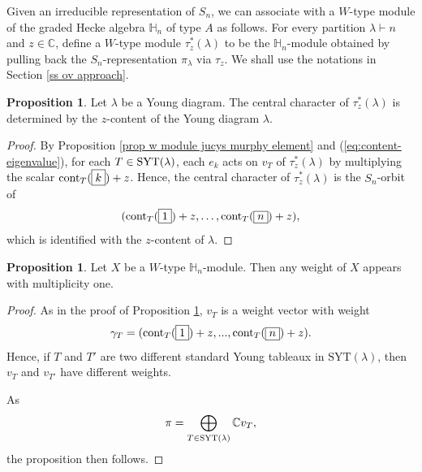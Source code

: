 \documentclass[11pt]{amsart}
\numberwithin{equation}{section}
\theoremstyle{definition}
\newtheorem{proposition}[thm]{Proposition}
\begin{document}
Given an irreducible representation of $S_{n}$, we can associate with a $W$-type module of the graded Hecke algebra  $\mathbb{H}_{n}$ of type $A$ as follows.  For every partition $\lambda\vdash n$ and $z\in\mathbb{C}$, define a \(W\)-type module $\tau_{z}^{*}(\lambda)$ to be the \(\mathbb H_n\)-module obtained by pulling back the \(S_n\)-representation \(\pi_{\lambda}\)  via $\tau_{z}$. We shall use the notations in Section \ref{ss ov approach}.



\begin{proposition}\label{prop:central character}\cite{barbasch2014unitary}
    Let \(\lambda\) be a Young diagram. The central character of $\tau_{z}^{*}(\lambda)$ is determined by the $z$-content of the Young diagram $\lambda$.
\end{proposition}
\begin{proof}
     By Proposition \ref{prop w module jucys murphy element} and (\ref{eq:content-eigenvalue}),  for each $T\in\textnormal{SYT}(\lambda)$, each $e_{k}$ acts on $v_{T}$ of $\tau_{z}^{*}(\lambda)$ by multiplying the scalar $\textnormal{cont}_{T}(\boxed{k})+z$. Hence, the central character of \(\tau^*_{z}(\lambda)\) is the $S_{n}$-orbit of 
     \[  (\textnormal{cont}_T(\boxed{1})+z, \ldots, \textnormal{cont}_T(\boxed{n})+z) ,
     \]
     which is identified with the $z$-content of $\lambda$.
\end{proof}

\begin{proposition} \label{prop multiplicity one weight}
Let $X$ be a $W$-type  $\mathbb H_n$-module. Then any weight of $X$ appears with multiplicity one. 
\end{proposition}

\begin{proof}
As in the proof of Proposition \ref{prop:central character}, $v_{T}$ is a weight vector with weight 
 \begin{equation*}
     \gamma_{T}=(\textnormal{cont}_{T}(\boxed{1})+z,...,\textnormal{cont}_{T}(\boxed{n})+z) .
 \end{equation*}
Hence, if \(T\) and \(T'\) are two different standard Young tableaux in $\mathrm{SYT}(\lambda)$, then \(v_T\) and \(v_{T'}\) have different weights.

As
\begin{equation*}
\pi=\bigoplus\limits_{T\in\textnormal{SYT}(\lambda)}\mathbb{C}v_{T},
\end{equation*}
the proposition then follows. 
\end{proof}
\end{document}
